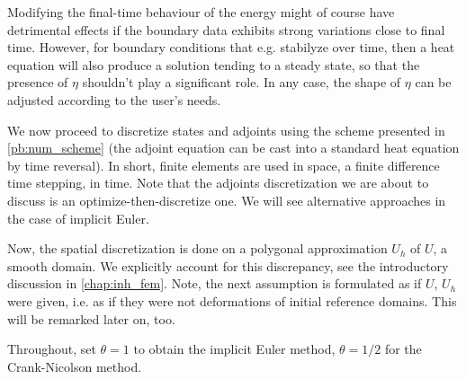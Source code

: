 \documentclass[english,a4paper,9pt,oneside]{scrbook}	%
\theoremstyle{break}
\theoremstyle{remark}
\begin{document}
Modifying the final-time behaviour of the energy might of course have detrimental effects if the boundary data exhibits strong variations close to final time. However, for boundary conditions that e.g. stabilyze over time, then a heat equation will also produce a solution tending to a steady state, so that the presence of $\eta$ shouldn't play a significant role. In any case, the shape of $\eta$ can be adjusted according to the user's needs.

We now proceed to discretize states and adjoints using the scheme presented in \cref{pb:num_scheme} (the adjoint equation can be cast into a standard heat equation by time reversal). In short, finite elements are used in space, a finite difference time stepping, in time. Note that the adjoints discretization we are about to discuss is an optimize-then-discretize one. We will see alternative approaches in the case of implicit Euler.


Now, the spatial discretization is done on a polygonal approximation $U_h$ of $U$, a smooth domain. We explicitly account for this discrepancy, see the introductory discussion in \cref{chap:inh_fem}. Note, the next assumption is formulated as if $U$, $U_h$ were given, i.e. as if they were not deformations of initial reference domains. This will be remarked later on, too. 

Throughout, set $\theta=1$ to obtain the implicit Euler method, $\theta=1/2$ for the Crank-Nicolson method.
\end{document}
